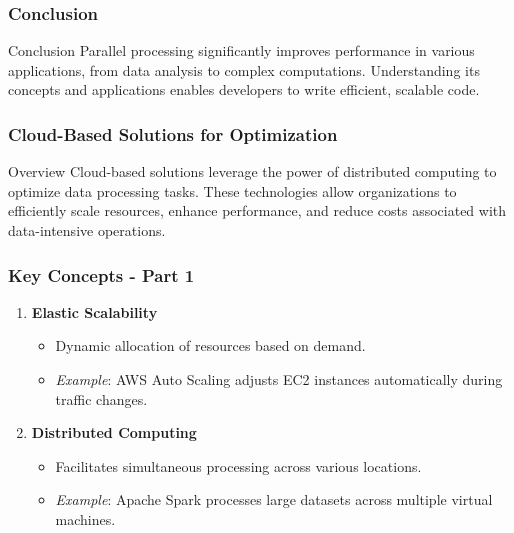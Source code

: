 \documentclass[aspectratio=169]{beamer}
\begin{document}
\begin{frame}[fragile]
    \frametitle{Conclusion}

    \begin{block}{Conclusion}
        Parallel processing significantly improves performance in various applications, from data analysis to complex computations.
        Understanding its concepts and applications enables developers to write efficient, scalable code.
    \end{block}
\end{frame}

\begin{frame}[fragile]
    \frametitle{Cloud-Based Solutions for Optimization}
    \begin{block}{Overview}
        Cloud-based solutions leverage the power of distributed computing to optimize data processing tasks. 
        These technologies allow organizations to efficiently scale resources, enhance performance, and 
        reduce costs associated with data-intensive operations.
    \end{block}
\end{frame}

\begin{frame}[fragile]
    \frametitle{Key Concepts - Part 1}
    \begin{enumerate}
        \item \textbf{Elastic Scalability}
        \begin{itemize}
            \item Dynamic allocation of resources based on demand.
            \item \textit{Example}: AWS Auto Scaling adjusts EC2 instances automatically during traffic changes.
        \end{itemize}
        
        \item \textbf{Distributed Computing}
        \begin{itemize}
            \item Facilitates simultaneous processing across various locations.
            \item \textit{Example}: Apache Spark processes large datasets across multiple virtual machines.
        \end{itemize}
    \end{enumerate}
\end{frame}
\end{document}
